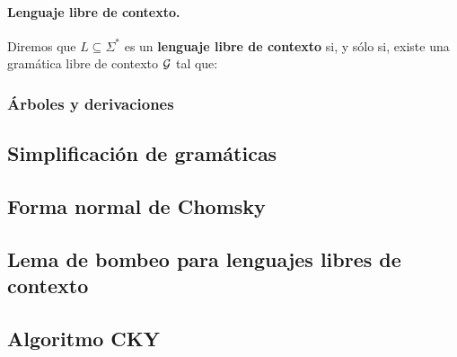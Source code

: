 \paragraph{Lenguaje libre de contexto.} Diremos que $L \subseteq \Sigma^*$ es un \textbf{lenguaje libre de contexto} si, y sólo si, existe una gramática libre de contexto $\mathcal{G}$ tal que:


\subsubsection{Árboles y derivaciones}

\subsection{Simplificación de gramáticas}
\subsection{Forma normal de Chomsky}
\subsection{Lema de bombeo para lenguajes libres de contexto}
\subsection{Algoritmo CKY}
